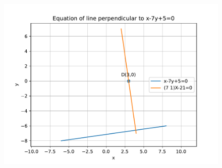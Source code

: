 \documentclass[12pt]{article}
\begin{document}
\begin{enumerate}
\begin{figure}[!h]
\begin{center}
\includegraphics[width=\columnwidth]{figs/fig.pdf}
\end{center}
\caption{}
\label{fig:Fig1}
\end{figure}
\end{enumerate}
\end{document}

